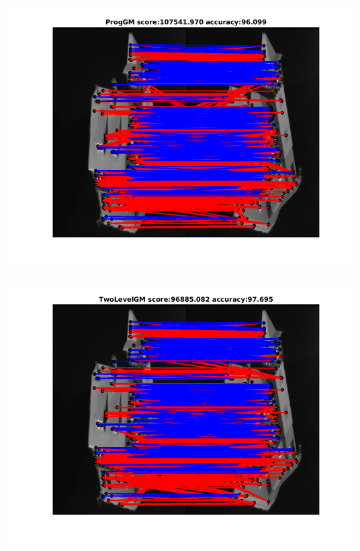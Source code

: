 \begin{figure}[h] 
	\begin{subfigure}[b]{0.3\textwidth}
		\centering
		\includegraphics[scale=0.25]{"chapter3/fig/HouseSeq/anchor_descr/using_cpd_afftrafo/ext_solution/fi_1_ProgGM"}  
	\end{subfigure}%
	\begin{subfigure}[b]{0.3\textwidth}
		\centering
		\includegraphics[scale=0.25]{"chapter3/fig/HouseSeq/anchor_descr/using_cpd_afftrafo/ext_solution/fi_1_TwoLevelGM"}  
	\end{subfigure} 
	\begin{subfigure}[b]{0.3\textwidth}
		\centering

\end{subfigure}
\end{figure}
